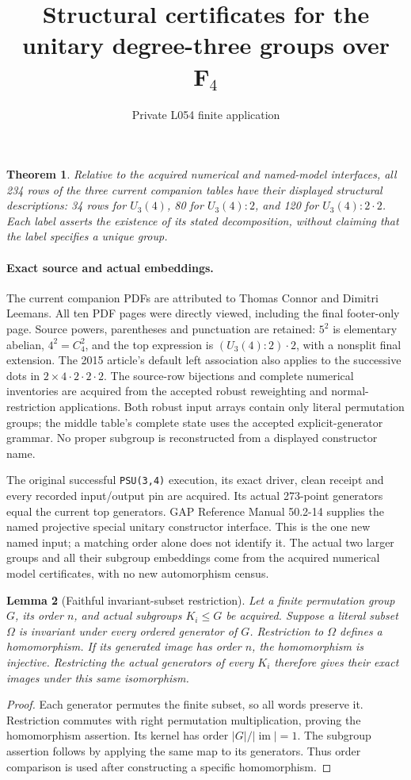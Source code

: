 \documentclass[11pt]{article}
\title{Structural certificates for the unitary degree-three groups over $\mathbf F_4$}
\author{Private L054 finite application}\date{}
\newtheorem{theorem}{Theorem}
\newtheorem{lemma}[theorem]{Lemma}
\begin{document}
\maketitle
\begin{theorem}
Relative to the acquired numerical and named-model interfaces, all 234
rows of the three current companion tables have their displayed structural
descriptions: 34 rows for $U_3(4)$, 80 for $U_3(4):2$, and 120 for
$U_3(4):2\mathbin{\cdot}2$. Each label asserts the existence of its stated
decomposition, without claiming that the label specifies a unique group.
\end{theorem}
\paragraph{Exact source and actual embeddings.}
The current companion PDFs are attributed to Thomas Connor and Dimitri
Leemans. All ten PDF pages were directly viewed, including the final
footer-only page. Source powers, parentheses and punctuation are retained:
$5^2$ is elementary abelian, $4^2=C_4^2$, and the top expression is
$(U_3(4):2)\mathbin{\cdot}2$, with a nonsplit final extension. The 2015
article's default left association also applies to the successive dots in
$2\times4\mathbin{\cdot}2\mathbin{\cdot}2\mathbin{\cdot}2$.
The source-row bijections and complete numerical inventories are acquired
from the accepted robust reweighting and normal-restriction applications.
Both robust input arrays contain only literal permutation groups; the
middle table's complete state uses the accepted explicit-generator grammar.
No proper subgroup is reconstructed from a displayed constructor name.

The original successful \texttt{PSU(3,4)} execution, its exact driver,
clean receipt and every recorded input/output pin are acquired. Its actual
273-point generators equal the current top generators. GAP Reference Manual
50.2-14 supplies the named projective special unitary constructor interface.
This is the one new named input; a matching order alone does not identify it.
The actual two larger groups and all their subgroup embeddings come from
the acquired numerical model certificates, with no new automorphism census.

\begin{lemma}[Faithful invariant-subset restriction]
Let a finite permutation group $G$, its order $n$, and actual subgroups
$K_i\leq G$ be acquired. Suppose a literal subset $\Omega$ is invariant
under every ordered generator of $G$. Restriction to $\Omega$ defines a
homomorphism. If its generated image has order $n$, the homomorphism is
injective. Restricting the actual generators of every $K_i$ therefore gives
their exact images under this same isomorphism.
\end{lemma}
\begin{proof}
Each generator permutes the finite subset, so all words preserve it.
Restriction commutes with right permutation multiplication, proving the
homomorphism assertion. Its kernel has order $|G|/|\operatorname{im}|=1$.
The subgroup assertion follows by applying the same map to its generators.
Thus order comparison is used after constructing a specific homomorphism.
\end{proof}
\end{document}
